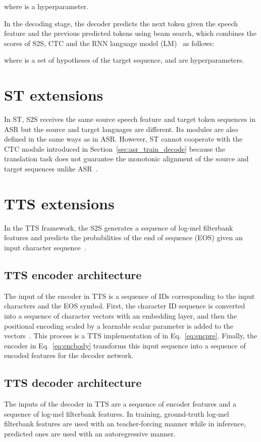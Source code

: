 where  is a hyperparameter.

In the decoding stage, the decoder predicts the next token given the speech feature  and the previous predicted tokens using beam search, which combines the scores of S2S, CTC and the RNN language model (LM)~\cite{Mikolov2010} as follows:

where  is a set of hypotheses of the target sequence, and  are hyperparameters.


\section{ST extensions}

In ST, S2S receives the same source speech feature and target token sequences in ASR but the source and target languages are different.
Its modules are also defined in the same ways as in ASR. However, ST cannot cooperate with the CTC module introduced in Section~\ref{sec:asr_train_decode} because the translation task does not guarantee the monotonic alignment of the source and target sequences unlike ASR~\cite{Weiss2017}.


\section{TTS extensions}
In the TTS framework, the S2S generates a sequence of log-mel filterbank features and predicts the probabilities of the end of sequence (EOS) given an input character sequence~\cite{DBLP:conf/icassp/ShenPWSJYCZWRSA18}.

\subsection{TTS encoder architecture}
The input of the encoder in TTS is a sequence of IDs corresponding to the input characters and the EOS symbol.
First, the character ID sequence is converted into a sequence of character vectors with an embedding layer, and then the positional encoding scaled by a learnable scalar parameter is added to the vectors~\cite{li2019close}.
This process is a TTS implementation of  in Eq.~\eqref{eq:encpre}.
Finally, the encoder  in Eq.~\eqref{eq:encbody} transforms this input sequence into a sequence of encoded features for the decoder network.

\subsection{TTS decoder architecture}
The inputs of the decoder in TTS are a sequence of encoder features and a sequence of log-mel filterbank features. 
In training, ground-truth log-mel filterbank features are used with an teacher-forcing manner while in inference, predicted ones are used with an autoregressive manner.

